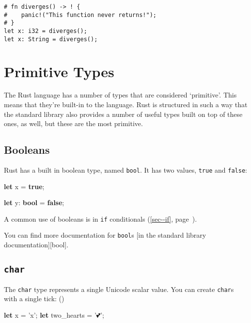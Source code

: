 \documentclass[a4paper,]{book}
\renewcommand*{\hyperref}[2][\ar]{%
  \def\ar{#2}%
  #2 (\autoref{#1}, page~\pageref{#1})}
\newenvironment{Shaded}{\begin{snugshade}}{\end{snugshade}}
\newcommand{\KeywordTok}[1]{\textcolor[rgb]{0.13,0.29,0.53}{\textbf{{#1}}}}
\newcommand{\CharTok}[1]{\textcolor[rgb]{0.31,0.60,0.02}{{#1}}}
\newcommand{\NormalTok}[1]{{#1}}
\begin{document}
\begin{verbatim}
# fn diverges() -> ! {
#    panic!("This function never returns!");
# }
let x: i32 = diverges();
let x: String = diverges();
\end{verbatim}

\section{Primitive Types}\label{sec--primitive-types}

The Rust language has a number of types that are considered `primitive'.
This means that they're built-in to the language. Rust is structured in
such a way that the standard library also provides a number of useful
types built on top of these ones, as well, but these are the most
primitive.

\subsection{Booleans}\label{booleans}

Rust has a built in boolean type, named \texttt{bool}. It has two
values, \texttt{true} and \texttt{false}:

\begin{Shaded}
\begin{Highlighting}[]
\KeywordTok{let} \NormalTok{x = }\KeywordTok{true}\NormalTok{;}

\KeywordTok{let} \NormalTok{y: }\KeywordTok{bool} \NormalTok{= }\KeywordTok{false}\NormalTok{;}
\end{Highlighting}
\end{Shaded}

A common use of booleans is in \hyperref[sec--if]{\texttt{if}
conditionals}.

You can find more documentation for \texttt{bool}s {[}in the standard
library documentation{]}{[}bool{]}.

\subsection{\texorpdfstring{\texttt{char}}{char}}\label{char}

The \texttt{char} type represents a single Unicode scalar value. You can
create \texttt{char}s with a single tick: (\texttt{\textquotesingle{}})

\begin{Shaded}
\begin{Highlighting}[]
\KeywordTok{let} \NormalTok{x = }\CharTok{'x'}\NormalTok{;}
\KeywordTok{let} \NormalTok{two_hearts = }\CharTok{'💕'}\NormalTok{;}
\end{Highlighting}
\end{Shaded}
\end{document}
